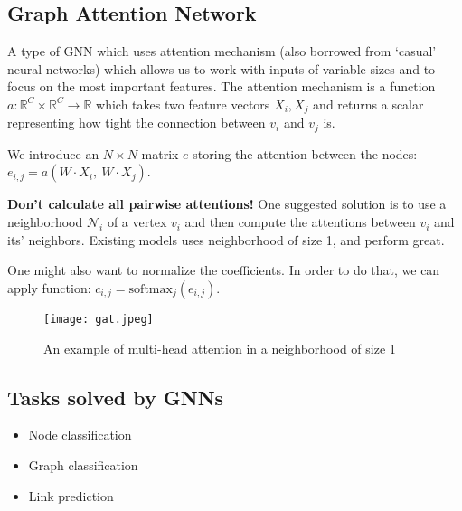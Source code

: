 \subsection{Graph Attention Network}
\begin{frame}[allowframebreaks]{\subsecname}
   A type of GNN which uses attention mechanism (also borrowed from `casual' neural networks) which allows us to work with inputs of variable sizes and to focus on the most important features.
   The attention mechanism is a function $a: \mathbb{R}^C \times \mathbb{R}^C \rightarrow \mathbb{R}$ which takes two feature vectors $X_i, X_j$ and returns a scalar representing how tight the connection between $v_i$ and $v_j$ is.
   
   \framebreak

   We introduce an $N \times N$ matrix $e$ storing the attention between the nodes: $e_{i, j} = a\left( W \cdot X_i,\ W \cdot X_j \right)$.

   \textbf{Don't calculate all pairwise attentions!}
   One suggested solution is to use a neighborhood $\mathcal{N}_i$ of a vertex $v_i$ and then compute the attentions between $v_i$ and its' neighbors.
   Existing models uses neighborhood of size 1, and perform great.

   One might also want to normalize the coefficients.
   In order to do that, we can apply  function: $c_{i, j} = \text{softmax}_j \left( e_{i, j} \right)$.

   \begin{figure}[h]
       \centering
       \texttt{[image: gat.jpeg]}
       \caption{An example of multi-head attention in a neighborhood of size 1}
   \end{figure}
\end{frame}

\subsection{Tasks solved by GNNs}
\begin{frame}{\subsecname}
   \begin{itemize}
      \item Node classification
      \item Graph classification
      \item Link prediction
   \end{itemize}
\end{frame}

